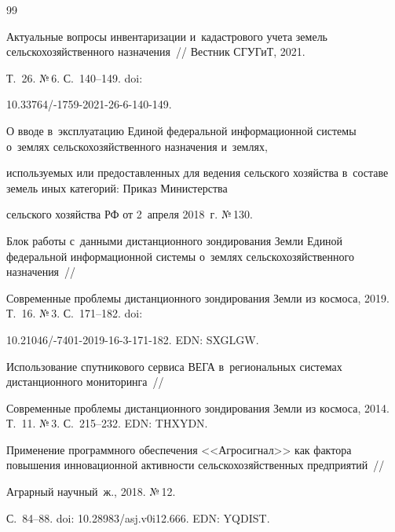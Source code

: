 {{\begin{thebibliography}{99}

 Актуальные вопросы инвентаризации и~кадастрового учета земель сельскохозяйственного назначения~/\!\!/ Вестник СГУГиТ, 2021. 

Т.~26. №\,6. С.~140--149. doi: 

10.33764\!/-1759-2021-26-6-140-149.




О вводе в~эксплуатацию Единой федеральной информационной системы о~землях сельскохозяйственного назначения и~землях, 

используемых или предоставленных для ведения сельского хозяйства в~со\-ста\-ве земель иных категорий: Приказ Министерства 

сельского хозяйства РФ от 2~апреля 2018~г. №\,130.



 Блок работы с~данными дистанционного зондирования Земли Единой федеральной информационной сис\-те\-мы о~землях сельскохозяйственного назначения~/\!\!/ 

 Современные проб\-ле\-мы дистанционного зондирования Земли из космоса, 2019. Т.~16. №\,3. С.~171--182. doi: 

10.21046\!/-7401-2019-16-3-171-182. EDN: SXGLGW.



 Использование спутникового сервиса ВЕГА в~региональных сис\-те\-мах дистанционного мониторинга~/\!\!/ 

 Современные проб\-ле\-мы дистанционного зондирования Земли из космоса, 2014. Т.~11. №\,3. С.~215--232. EDN: THXYDN.



 Применение про\-граммного обеспечения <<Агросигнал>> как фактора повышения инновационной активности сельскохозяйственных предприятий~/\!\!/ 

 Аграрный научный~ж., 2018. №\,12.

С.~84--88. doi: 10.28983\!/\!asj.v0i12.666. EDN: YQDIST.


\end{thebibliography}}}
